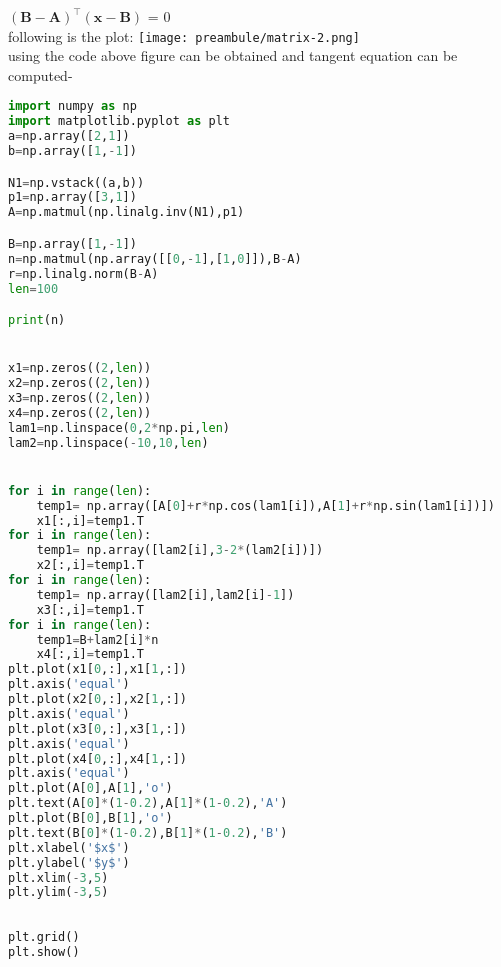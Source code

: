 \documentclass{beamer}
\begin{document}
$\mathbf{(B-A)}^\intercal \mathbf{(x-B)}$ = 0\\
following is the plot:
\texttt{[image: preambule/matrix-2.png]}\\
using the code above figure can be obtained and  tangent equation can be computed-\\
\begin{lstlisting}[language=Python]
import numpy as np 
import matplotlib.pyplot as plt
a=np.array([2,1])
b=np.array([1,-1])

N1=np.vstack((a,b))
p1=np.array([3,1])
A=np.matmul(np.linalg.inv(N1),p1)

B=np.array([1,-1])
n=np.matmul(np.array([[0,-1],[1,0]]),B-A)
r=np.linalg.norm(B-A)
len=100

print(n)


x1=np.zeros((2,len))
x2=np.zeros((2,len))
x3=np.zeros((2,len))
x4=np.zeros((2,len))
lam1=np.linspace(0,2*np.pi,len)
lam2=np.linspace(-10,10,len)


for i in range(len):
	temp1= np.array([A[0]+r*np.cos(lam1[i]),A[1]+r*np.sin(lam1[i])])
	x1[:,i]=temp1.T
for i in range(len):
	temp1= np.array([lam2[i],3-2*(lam2[i])])
	x2[:,i]=temp1.T
for i in range(len):
	temp1= np.array([lam2[i],lam2[i]-1])
	x3[:,i]=temp1.T	
for i in range(len):
	temp1=B+lam2[i]*n
	x4[:,i]=temp1.T
plt.plot(x1[0,:],x1[1,:])
plt.axis('equal')
plt.plot(x2[0,:],x2[1,:])
plt.axis('equal')
plt.plot(x3[0,:],x3[1,:])
plt.axis('equal')
plt.plot(x4[0,:],x4[1,:])
plt.axis('equal')
plt.plot(A[0],A[1],'o')
plt.text(A[0]*(1-0.2),A[1]*(1-0.2),'A')
plt.plot(B[0],B[1],'o')
plt.text(B[0]*(1-0.2),B[1]*(1-0.2),'B')
plt.xlabel('$x$')
plt.ylabel('$y$')
plt.xlim(-3,5)
plt.ylim(-3,5)
	
	
plt.grid()
plt.show()
	

\end{lstlisting}
\end{document}
